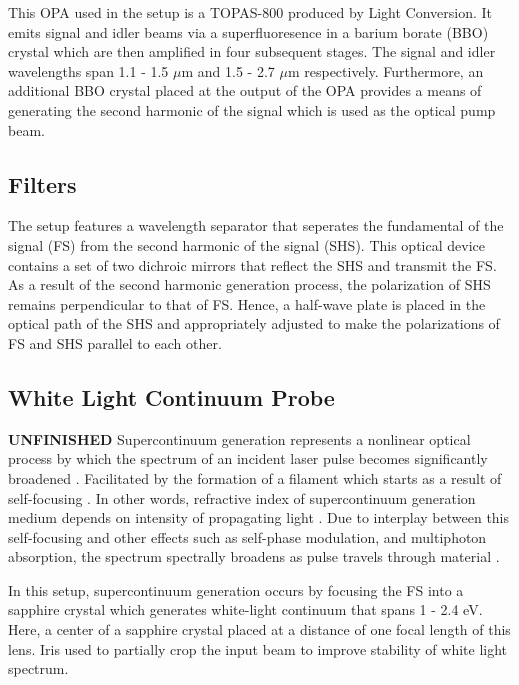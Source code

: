 This OPA used in the setup is a TOPAS-800 produced by Light Conversion. It emits signal and idler beams via a superfluoresence in a barium borate (BBO) crystal which are then amplified in four subsequent stages. The signal and idler wavelengths span 1.1 - 1.5 $\mu$m  and 1.5 - 2.7 $\mu$m respectively. Furthermore, an additional BBO crystal placed at the output of the OPA provides a means of generating the second harmonic of the signal which is used as the optical pump beam.

\subsection{Filters}

The setup features a wavelength separator that seperates the fundamental of the signal (FS) from the second harmonic of the signal (SHS). This optical device contains a set of two dichroic mirrors that reflect the SHS and transmit the FS. As a result of the second harmonic generation process, the polarization of SHS remains perpendicular to that of FS. Hence, a half-wave plate is placed in the optical path of the SHS and appropriately adjusted to make the polarizations of FS and SHS parallel to each other. 
 
\subsection{White Light Continuum Probe}


\label{section:white_light_probe}
\textbf{\color{red}UNFINISHED} Supercontinuum generation represents a nonlinear optical process by which the spectrum of an incident laser pulse becomes significantly broadened \cite{dubietis2017ultrafast}. Facilitated by the formation of a filament which starts as a result of self-focusing \cite{dubietis2017ultrafast}. In other words, refractive index of supercontinuum generation medium depends on intensity of propagating light \cite{dubietis2017ultrafast}. Due to interplay between this self-focusing and other effects such as self-phase modulation, and multiphoton absorption, the spectrum spectrally broadens as pulse travels through material \cite{dubietis2017ultrafast}. 

In this setup, supercontinuum generation occurs by focusing the FS into a sapphire crystal which generates white-light continuum that spans 1 - 2.4 eV. Here, a center of a sapphire crystal placed at a distance of one focal length of this lens. Iris used to partially crop the input beam to improve stability of white light spectrum. 

